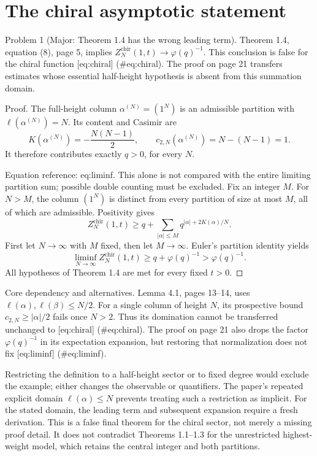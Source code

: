 \documentclass[10pt]{article}
\begin{document}
\section*{The chiral asymptotic statement}
Problem 1 (Major: Theorem 1.4 has the wrong leading term).  Theorem 1.4, equation (8), page 5, implies \(Z_N^{\mathrm{chir}}(1,t)\to\varphi(q)^{-1}\). This conclusion is false for the chiral function [eq:chiral] (\#eq:chiral). The proof on page 21 transfers estimates whose essential half-height hypothesis is absent from this summation domain.\par
Proof. The full-height column \(\alpha^{(N)}=(1^N)\) is an admissible partition with \(\ell(\alpha^{(N)})=N\). Its content and Casimir are \[K(\alpha^{(N)})=-\frac{N(N-1)}2,\qquad
c_{2,N}(\alpha^{(N)})=N-(N-1)=1.\] It therefore contributes exactly \(q>0\), for every \(N\).\par
Equation reference: eq:liminf. This alone is not compared with the entire limiting partition sum; possible double counting must be excluded. Fix an integer \(M\). For \(N>M\), the column \((1^N)\) is distinct from every partition of size at most \(M\), all of which are admissible. Positivity gives \[Z_N^{\mathrm{chir}}(1,t)\geq
q+\sum_{|\alpha|\leq M}q^{|\alpha|+2K(\alpha)/N}.\] First let \(N\to\infty\) with \(M\) fixed, then let \(M\to\infty\). Euler’s partition identity yields \[
\liminf_{N\to\infty} Z_N^{\mathrm{chir}}(1,t)
\geq q+\varphi(q)^{-1}>\varphi(q)^{-1}.\] All hypotheses of Theorem 1.4 are met for every fixed \(t>0\). ◻\par
Core dependency and alternatives. Lemma 4.1, pages 13–14, uses \(\ell(\alpha),\ell(\beta)\leq N/2\). For a single column of height \(N\), its prospective bound \(c_{2,N}\geq|\alpha|/2\) fails once \(N>2\). Thus its domination cannot be transferred unchanged to [eq:chiral] (\#eq:chiral). The proof on page 21 also drops the factor \(\varphi(q)^{-1}\) in its expectation expansion, but restoring that normalization does not fix [eq:liminf] (\#eq:liminf).\par
Restricting the definition to a half-height sector or to fixed degree would exclude the example; either changes the observable or quantifiers. The paper’s repeated explicit domain \(\ell(\alpha)\leq N\) prevents treating such a restriction as implicit. For the stated domain, the leading term and subsequent expansion require a fresh derivation. This is a false final theorem for the chiral sector, not merely a missing proof detail. It does not contradict Theorems 1.1–1.3 for the unrestricted highest-weight model, which retains the central integer and both partitions.\par
\end{document}
